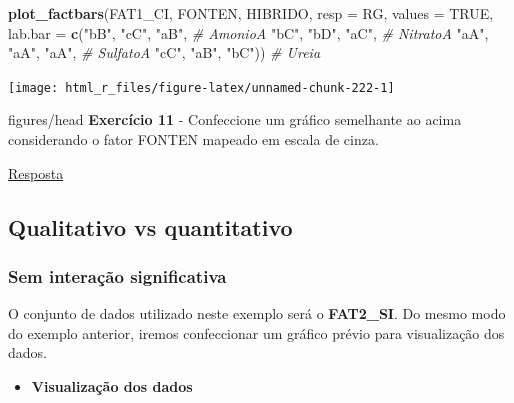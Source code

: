 \documentclass[
]{book}
\newenvironment{Shaded}{\begin{snugshade}}{\end{snugshade}}
\newcommand{\CommentTok}[1]{\textcolor[rgb]{0.56,0.35,0.01}{\textit{#1}}}
\newcommand{\DataTypeTok}[1]{\textcolor[rgb]{0.13,0.29,0.53}{#1}}
\newcommand{\KeywordTok}[1]{\textcolor[rgb]{0.13,0.29,0.53}{\textbf{#1}}}
\newcommand{\NormalTok}[1]{#1}
\newcommand{\OtherTok}[1]{\textcolor[rgb]{0.56,0.35,0.01}{#1}}
\newcommand{\StringTok}[1]{\textcolor[rgb]{0.31,0.60,0.02}{#1}}
\providecommand{\tightlist}{%
  \setlength{\itemsep}{0pt}\setlength{\parskip}{0pt}}
\numberwithin{equation}{section}
\newcommand{\indt}[1]{\index{#1|ST}}
\newenvironment{tarefa}
  {\begin{customBlockImage}[colframe=customOrange, title=Tarefa de casa]{figures/head}}
  {\end{customBlockImage}}
\begin{document}
\begin{Shaded}
\begin{Highlighting}[]

\KeywordTok{plot\_factbars}\NormalTok{(FAT1\_CI, FONTEN, HIBRIDO, }\DataTypeTok{resp =}\NormalTok{ RG,}
              \DataTypeTok{values =} \OtherTok{TRUE}\NormalTok{,}
              \DataTypeTok{lab.bar =} \KeywordTok{c}\NormalTok{(}\StringTok{"bB"}\NormalTok{, }\StringTok{"cC"}\NormalTok{, }\StringTok{"aB"}\NormalTok{, }\CommentTok{\# AmonioA}
                          \StringTok{"bC"}\NormalTok{, }\StringTok{"bD"}\NormalTok{, }\StringTok{"aC"}\NormalTok{, }\CommentTok{\# NitratoA}
                          \StringTok{"aA"}\NormalTok{, }\StringTok{"aA"}\NormalTok{, }\StringTok{"aA"}\NormalTok{, }\CommentTok{\# SulfatoA}
                          \StringTok{"cC"}\NormalTok{, }\StringTok{"aB"}\NormalTok{, }\StringTok{"bC"}\NormalTok{)) }\CommentTok{\# Ureia}
\end{Highlighting}
\end{Shaded}

\begin{center}\texttt{[image: html\_r\_files/figure-latex/unnamed-chunk-222-1]} \end{center}

\indt{Exercícios}
\begin{tarefa}
\textbf{Exercício 11}
- Confeccione um gráfico semelhante ao acima considerando o fator FONTEN mapeado em escala de cinza.
\end{tarefa}

\protect\hyperlink{exerc11}{Resposta}

\hypertarget{qualitativo-vs-quantitativo}{%
\subsection{Qualitativo vs quantitativo}\label{qualitativo-vs-quantitativo}}

\hypertarget{sem-interauxe7uxe3o-significativa-1}{%
\subsubsection{Sem interação significativa}\label{sem-interauxe7uxe3o-significativa-1}}

O conjunto de dados utilizado neste exemplo será o \textbf{FAT2\_SI}. Do mesmo modo do exemplo anterior, iremos confeccionar um gráfico prévio para visualização dos dados.

\begin{itemize}
\tightlist
\item
  \textbf{Visualização dos dados}
\end{itemize}
\end{document}
